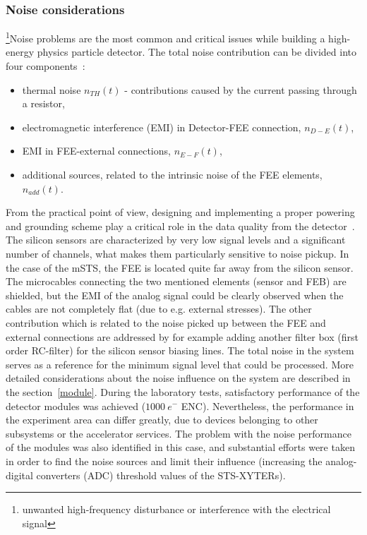 \subsubsection{Noise considerations}
\footnote{unwanted high-frequency disturbance or interference with the electrical signal}{Noise} problems are the most common and critical issues while building a high-energy physics particle detector. The total noise contribution can be divided into four components~\cite{noise_twepp2008}:
\begin{itemize}
    \item thermal noise $n_{TH}(t)$ - contributions caused by the current passing through a resistor,
    \item electromagnetic interference (\gls{EMI}) in Detector-\gls{FEE} connection, $n_{D-E}(t)$,
    \item \gls{EMI} in \gls{FEE}-external connections, $n_{E-F}(t)$,
    \item additional sources, related to the intrinsic noise of the FEE elements, $n_{add}(t)$.
\end{itemize}

From the practical point of view, designing and implementing a proper powering and grounding scheme play a critical role in the data quality from the detector~\cite{Bobillier:1159563}. The silicon sensors are characterized by very low signal levels and a significant number of channels, what makes them particularly sensitive to noise pickup. In the case of the \gls{mSTS}, the \gls{FEE} is located quite far away from the silicon sensor. The microcables connecting the two mentioned elements (sensor and \gls{FEB}) are shielded, but the \gls{EMI} of the analog signal could be clearly observed when the cables are not completely flat (due to e.g. external stresses). The other contribution which is related to the noise picked up between the \gls{FEE} and external connections are addressed by for example adding another filter box (first order RC-filter) for the silicon sensor biasing lines. The total noise in the system serves as a reference for the minimum signal level that could be processed. More detailed considerations about the noise influence on the system are described in the section~\ref{module}. During the laboratory tests, satisfactory performance of the detector modules was achieved ($1000~e^{-}$ \gls{ENC}). Nevertheless, the performance in the experiment area can differ greatly, due to devices belonging to other subsystems or the accelerator services. The problem with the noise performance of the modules was also identified in this case, and substantial efforts were taken in order to find the noise sources and limit their influence (increasing the analog-digital converters (\gls{ADC}) threshold values of the STS-XYTERs). 

